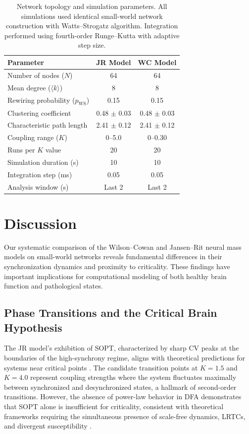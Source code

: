\documentclass[11pt]{article}
\begin{document}
\begin{table}[H]
\centering
\caption{Network topology and simulation parameters. All simulations used identical small-world network construction with Watts--Strogatz algorithm. Integration performed using fourth-order Runge--Kutta with adaptive step size.}
\label{tab:network_params}
\begin{tabular}{lcc}
\toprule
Parameter & JR Model & WC Model \\
\midrule
Number of nodes ($N$) & 64 & 64 \\
Mean degree ($\langle k \rangle$) & 8 & 8 \\
Rewiring probability ($p_{\text{WS}}$) & 0.15 & 0.15 \\
Clustering coefficient & 0.48 $\pm$ 0.03 & 0.48 $\pm$ 0.03 \\
Characteristic path length & 2.41 $\pm$ 0.12 & 2.41 $\pm$ 0.12 \\
Coupling range ($K$) & 0--5.0 & 0--0.30 \\
Runs per $K$ value & 20 & 20 \\
Simulation duration (s) & 10 & 10 \\
Integration step (ms) & 0.05 & 0.05 \\
Analysis window (s) & Last 2 & Last 2 \\
\bottomrule
\end{tabular}
\end{table}

\section{Discussion}

Our systematic comparison of the Wilson--Cowan and Jansen--Rit neural mass models on small-world networks reveals fundamental differences in their synchronization dynamics and proximity to criticality. These findings have important implications for computational modeling of both healthy brain function and pathological states.

\subsection{Phase Transitions and the Critical Brain Hypothesis}

The JR model's exhibition of SOPT, characterized by sharp CV peaks at the boundaries of the high-synchrony regime, aligns with theoretical predictions for systems near critical points \citep{cocchi2017criticality}. The candidate transition points at $K = 1.5$ and $K = 4.0$ represent coupling strengths where the system fluctuates maximally between synchronized and desynchronized states, a hallmark of second-order transitions. However, the absence of power-law behavior in DFA demonstrates that SOPT alone is insufficient for criticality, consistent with theoretical frameworks requiring the simultaneous presence of scale-free dynamics, LRTCs, and divergent susceptibility \citep{munoz2018colloquium}.
\end{document}

